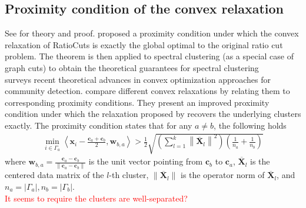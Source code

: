 	\subsection{Proximity condition of the convex relaxation}\label{sec:proximity condition}
		See \citet{Ling2019,Li2017,Peng2005,Zhao2012} for theory and proof.
		\citet{Ling2019} proposed a proximity condition under which the convex relaxation of RatioCuts is exactly the global optimal to the original ratio cut problem. The theorem is then applied to spectral clustering {(as a special case of graph cuts)} to obtain the theoretical guarantees for spectral clustering
		\\
		\citet{Li2018} surveys recent theoretical advances in convex optimization approaches for community detection.
		\citet{Li2017} compare different convex relaxations by relating them to corresponding proximity conditions. They present an improved proximity condition under which the relaxation proposed by \citet{Peng2005} recovers the underlying clusters exactly.
		The proximity condition states that for any $a\neq b$, the following holds
		\begin{align*}
		\min _{i\in\Gamma_a}\left\langle \mathbf{x}_{i}-\frac{\mathbf{c}_{a}+\mathbf{c}_{b}}{2}, \mathbf{w}_{b, a}\right\rangle>\frac{1}{2} \sqrt{\left(\sum_{l=1}^{k}\left\|\overline{\mathbf{X}}_{l}\right\|^{2}\right)\left(\frac{1}{n_{a}}+\frac{1}{n_{b}}\right)} 
		\end{align*}
		where $\mathbf{w}_{b,a} = \frac{\mathbf{c}_a - \mathbf{c}_b}{\| \mathbf{c}_a - \mathbf{c}_b \|}$ is the unit vector pointing from $\mathbf{c}_b$ to $\mathbf{c}_a$,
		$\overline{\mathbf{X}}_l$ is the centered data matrix of the $l$-th cluster, $\|\overline{\mathbf{X}}_l\|$  is the operator norm of $\overline{\mathbf{X}}_l$, and $n_a=|\Gamma_a|,n_b=|\Gamma_b|$.
		\\
		\textcolor{red}{It seems to require the clusters are well-separated?}
		


	
		




		

